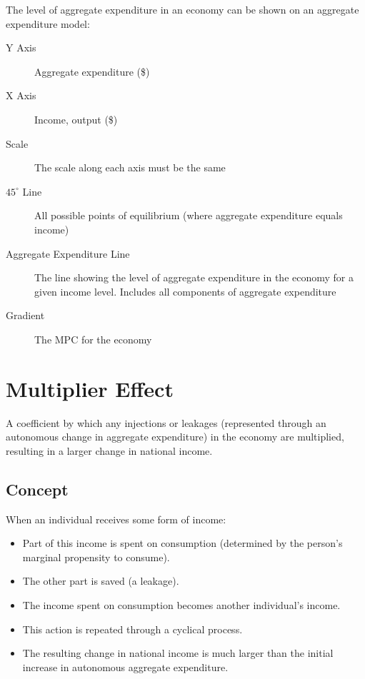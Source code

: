 \documentclass[a4paper,11pt]{article}
\begin{document}

The level of aggregate expenditure in an economy can be shown on an aggregate
expenditure model:

\begin{description}
\item [Y Axis] Aggregate expenditure (\$)
\item [X Axis] Income, output (\$)
\item [Scale] The scale along each axis must be the same
\item [$45^\circ$ Line] All possible points of equilibrium (where aggregate
	expenditure equals income)
\item [Aggregate Expenditure Line] The line showing the level of aggregate
	expenditure in the economy for a given income level. Includes all components
	of aggregate expenditure
\item [Gradient] The MPC for the economy
\end{description}




\section{Multiplier Effect}

A coefficient by which any injections or leakages (represented through an
autonomous change in aggregate expenditure) in the economy are multiplied,
resulting in a larger change in national income.


\subsection{Concept}

When an individual receives some form of income:

\begin{itemize}
\item Part of this income is spent on consumption (determined by the person's
	marginal propensity to consume).
\item The other part is saved (a leakage).
\item The income spent on consumption becomes another individual's income.
\item This action is repeated through a cyclical process.
\item The resulting change in national income is much larger than the initial
	increase in autonomous aggregate expenditure.
\end{itemize}
\end{document}
